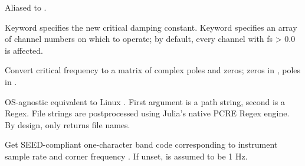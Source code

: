 \documentclass[letterpaper,11pt,english]{sphinxmanual}
\begin{document}
Aliased to .

Keyword  specifies the new critical damping constant. Keyword  specifies an array of channel numbers on which to operate; by default, every channel with fs \textgreater{} 0.0 is affected.

\begin{fulllineitems}
\label{\detokenize{src/Appendices/function_list:fctopz}}
\end{fulllineitems}


Convert critical frequency  to a matrix of complex poles and zeros; zeros in , poles in .

\begin{fulllineitems}
\label{\detokenize{src/Appendices/function_list:find_regex}}
\end{fulllineitems}


OS-agnostic equivalent to Linux . First argument is a path string, second is a Regex. File strings are postprocessed using Julia’s native PCRE Regex engine. By design,  only returns file names.

\begin{fulllineitems}
\label{\detokenize{src/Appendices/function_list:getbandcode}}
\end{fulllineitems}


Get SEED-compliant one-character band code corresponding to instrument sample rate  and corner frequency . If unset,  is assumed to be 1 Hz.

\begin{fulllineitems}
\label{\detokenize{src/Appendices/function_list:ls}}
\end{fulllineitems}
\end{document}
